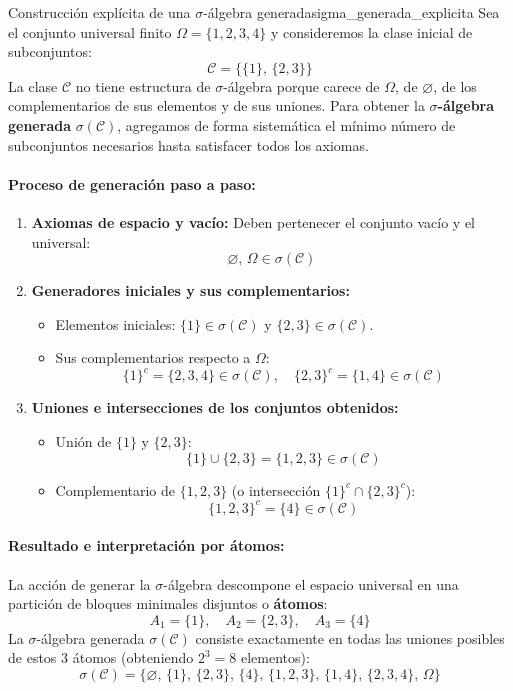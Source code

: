 \begin{ejemplo}{Construcción explícita de una $\sigma$-álgebra generada}{sigma_generada_explicita}
Sea el conjunto universal finito $\Omega = \{1, 2, 3, 4\}$ y consideremos la clase inicial de subconjuntos:
\[
    \mathcal{C} = \bigl\{ \{1\}, \, \{2, 3\} \bigr\}
\]
La clase $\mathcal{C}$ no tiene estructura de $\sigma$-álgebra porque carece de $\Omega$, de $\varnothing$, de los complementarios de sus elementos y de sus uniones. Para obtener la \textbf{$\sigma$-álgebra generada} $\sigma(\mathcal{C})$, agregamos de forma sistemática el mínimo número de subconjuntos necesarios hasta satisfacer todos los axiomas.

\paragraph{Proceso de generación paso a paso:}
\begin{enumerate}
    \item \textbf{Axiomas de espacio y vacío:}
    Deben pertenecer el conjunto vacío y el universal:
    \[
        \varnothing, \, \Omega \in \sigma(\mathcal{C})
    \]

    \item \textbf{Generadores iniciales y sus complementarios:}
    \begin{itemize}
        \item Elementos iniciales: $\{1\} \in \sigma(\mathcal{C})$ y $\{2, 3\} \in \sigma(\mathcal{C})$.
        \item Sus complementarios respecto a $\Omega$:
        \[
            \{1\}^c = \{2, 3, 4\} \in \sigma(\mathcal{C}), \quad \{2, 3\}^c = \{1, 4\} \in \sigma(\mathcal{C})
        \]
    \end{itemize}

    \item \textbf{Uniones e intersecciones de los conjuntos obtenidos:}
    \begin{itemize}
        \item Unión de $\{1\}$ y $\{2, 3\}$:
        \[
            \{1\} \cup \{2, 3\} = \{1, 2, 3\} \in \sigma(\mathcal{C})
        \]
        \item Complementario de $\{1, 2, 3\}$ (o intersección $\{1\}^c \cap \{2, 3\}^c$):
        \[
            \{1, 2, 3\}^c = \{4\} \in \sigma(\mathcal{C})
        \]
    \end{itemize}
\end{enumerate}

\paragraph{Resultado e interpretación por átomos:}
La acción de generar la $\sigma$-álgebra descompone el espacio universal en una partición de bloques minimales disjuntos o \textbf{átomos}:
\[
    A_1 = \{1\}, \quad A_2 = \{2, 3\}, \quad A_3 = \{4\}
\]
La $\sigma$-álgebra generada $\sigma(\mathcal{C})$ consiste exactamente en todas las uniones posibles de estos 3 átomos (obteniendo $2^3 = 8$ elementos):
\[
    \sigma(\mathcal{C}) = \bigl\{ \varnothing, \, \{1\}, \, \{2, 3\}, \, \{4\}, \, \{1, 2, 3\}, \, \{1, 4\}, \, \{2, 3, 4\}, \, \Omega \bigr\}
\]
\end{ejemplo}

